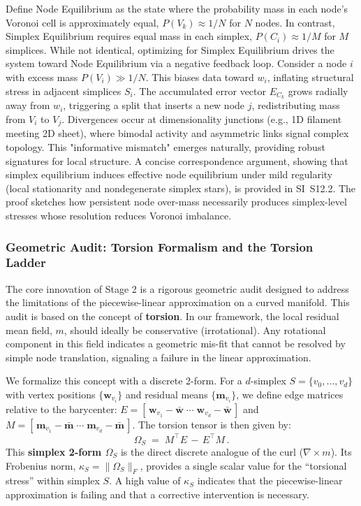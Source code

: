 \documentclass[11pt]{article}
\begin{document}
Define Node Equilibrium as the state where the probability mass in each node's Voronoi cell is approximately equal, $P(V_k) \approx 1/N$ for $N$ nodes. In contrast, Simplex Equilibrium requires equal mass in each simplex, $P(C_i) \approx 1/M$ for $M$ simplices. While not identical, optimizing for Simplex Equilibrium drives the system toward Node Equilibrium via a negative feedback loop. Consider a node $i$ with excess mass $P(V_i) \gg 1/N$. This biases data toward $w_i$, inflating structural stress in adjacent simplices $S_i$. The accumulated error vector $E_{C_k}$ grows radially away from $w_i$, triggering a split that inserts a new node $j$, redistributing mass from $V_i$ to $V_j$. Divergences occur at dimensionality junctions (e.g., 1D filament meeting 2D sheet), where bimodal activity and asymmetric links signal complex topology. This "informative mismatch" emerges naturally, providing robust signatures for local structure. A concise correspondence argument, showing that simplex equilibrium induces effective node equilibrium under mild regularity (local stationarity and nondegenerate simplex stars), is provided in SI~S12.2. The proof sketches how persistent node over-mass necessarily produces simplex-level stresses whose resolution reduces Voronoi imbalance.

\subsubsection{Geometric Audit: Torsion Formalism and the Torsion Ladder}
The core innovation of Stage 2 is a rigorous geometric audit designed to address the limitations of the piecewise-linear approximation on a curved manifold. This audit is based on the concept of \textbf{torsion}. In our framework, the local residual mean field, $m$, should ideally be conservative (irrotational). Any rotational component in this field indicates a geometric mis-fit that cannot be resolved by simple node translation, signaling a failure in the linear approximation.

We formalize this concept with a discrete 2-form. For a $d$-simplex $S=\{v_0,\dots,v_d\}$ with vertex positions $\{\mathbf w_{v_i}\}$ and residual means $\{\mathbf m_{v_i}\}$, we define edge matrices relative to the barycenter: $E=[\,\mathbf w_{v_1}{-}\bar{\mathbf w}\;\cdots\;\mathbf w_{v_d}{-}\bar{\mathbf w}\,]$ and $M=[\,\mathbf m_{v_1}{-}\bar{\mathbf m}\;\cdots\;\mathbf m_{v_d}{-}\bar{\mathbf m}\,]$. The torsion tensor is then given by:
\[
\Omega_S \;=\; M^{\top}E \,{-}\, E^{\top}M\,.
\]
This \textbf{simplex 2-form $\Omega_S$} is the direct discrete analogue of the curl ($\nabla \times m$). Its Frobenius norm, $\kappa_S = \lVert \Omega_S \rVert_F$, provides a single scalar value for the ``torsional stress'' within simplex $S$. A high value of $\kappa_S$ indicates that the piecewise-linear approximation is failing and that a corrective intervention is necessary.
\end{document}
